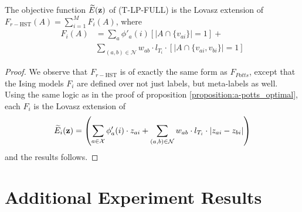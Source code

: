 {{{{\proposition The objective function $\widetilde{E}({\bf z})$ of (T-LP-FULL) is the Lovasz extension of $F_{r-\textrm{HST}}(A) = \sum_{i = 1}^M F_i(A)$, where
\begin{align}
    F_i(A) &= \sum_a \phi'_{a}(i) [|A \cap \{v_{ai}\}| = 1] + \nonumber \\
           &\sum_{(a, b) \in {\mathcal N}} {w_{ab}} \cdot l_{T_i} \cdot [|A \cap \{v_{ai}, v_{bi}\}| = 1]
\end{align}
\begin{proof}
    We observe that $F_{r-\textrm{HST}}$ is of exactly the same form as $F_{Potts}$, except that the Ising models $F_i$ are defined over not just labels, but meta-labels as well. Using the same logic as in the proof of proposition \ref{proposition:a-potts_optimal}, each $F_i$ is the Lovasz extension of 
        \begin{equation}
            \widetilde{E}_i({\bf z}) = \left( \sum_{a \in {\mathcal X}} \phi_a'(i) \cdot z_{ai} + \sum_{(a, b) \in {\mathcal N}} w_{ab} \cdot l_{T_i} \cdot |z_{ai} - z_{bi}| \right)
        \end{equation}
    and the results follows. 
\end{proof}
\iffalse
\section{Additional Experiment Results}

}}}}
